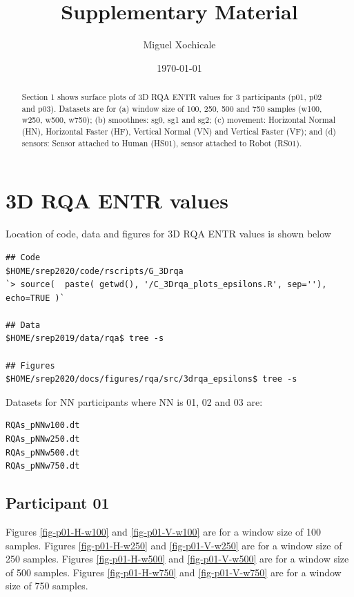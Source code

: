 \documentclass[12pt]{article}
\title{
Supplementary Material
}
\author{Miguel Xochicale}
\date{ \today }
\begin{document}
\maketitle

\begin{abstract}
Section 1 shows surface plots of 3D RQA ENTR values for 3 participants (p01, p02 and p03).
Datasets are for 
(a) window size of 100, 250, 500 and 750 samples (w100, w250, w500, w750);
(b) smoothnes: sg0, sg1 and sg2;
(c) movement: Horizontal Normal (HN), Horizontal Faster (HF), Vertical Normal (VN) and Vertical Faster (VF); and 
(d) sensors: Sensor attached to Human (HS01), sensor attached to Robot (RS01).
\end{abstract}

\tableofcontents


\section{3D RQA ENTR values}
Location of code, data and figures for 3D RQA ENTR values is shown below 
\begin{verbatim}
## Code
$HOME/srep2020/code/rscripts/G_3Drqa
`> source(  paste( getwd(), '/C_3Drqa_plots_epsilons.R', sep=''), echo=TRUE )`

## Data
$HOME/srep2019/data/rqa$ tree -s 

## Figures
$HOME/srep2020/docs/figures/rqa/src/3drqa_epsilons$ tree -s
\end{verbatim}

Datasets for NN participants where NN is 01, 02 and 03 are:
\begin{verbatim}
RQAs_pNNw100.dt
RQAs_pNNw250.dt
RQAs_pNNw500.dt
RQAs_pNNw750.dt
\end{verbatim}



\subsection{Participant 01}

Figures \ref{fig-p01-H-w100} and \ref{fig-p01-V-w100} are for a window size of 100 samples.
Figures \ref{fig-p01-H-w250} and \ref{fig-p01-V-w250} are for a window size of 250 samples.
Figures \ref{fig-p01-H-w500} and \ref{fig-p01-V-w500} are for a window size of 500 samples.
Figures \ref{fig-p01-H-w750} and \ref{fig-p01-V-w750} are for a window size of 750 samples.
\end{document}
